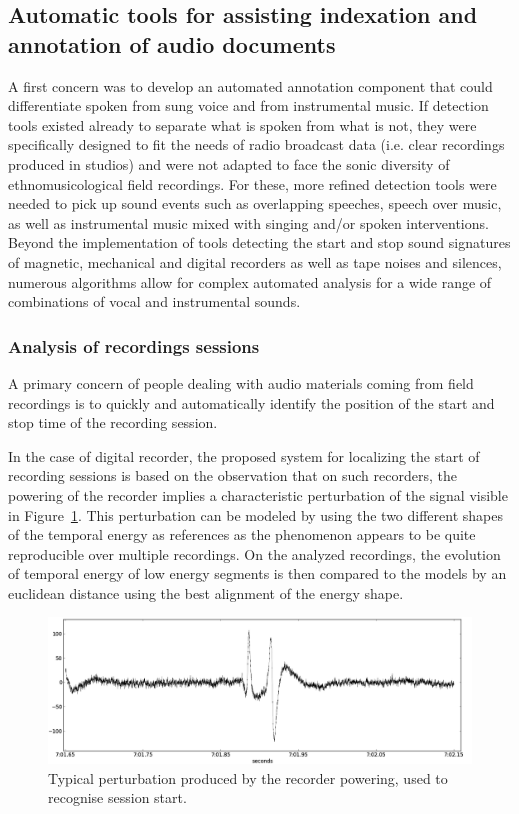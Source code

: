 \documentclass{sig-alternate}
\begin{document}
\subsection{Automatic tools for assisting indexation and annotation of audio documents}
A first concern was to develop an automated annotation component that could differentiate spoken from sung voice and from instrumental music. If detection tools existed already to separate what is spoken from what is not, they were specifically designed to fit the needs of radio broadcast data (i.e. clear recordings produced in studios) and were not adapted to face the sonic diversity of ethnomusicological field recordings. For these, more refined detection tools were needed to pick up sound events such as overlapping speeches, speech over music, as well as instrumental music mixed with singing and/or spoken interventions.
Beyond the implementation of tools detecting the start and stop sound signatures of magnetic, mechanical and digital recorders as well as tape noises and silences, numerous algorithms allow for complex automated analysis for a wide range of combinations of vocal and instrumental sounds.


\subsubsection{Analysis of recordings sessions}
A primary concern of people dealing with audio materials coming from field recordings is to quickly and automatically identify the position of the start and stop time of the recording session.

In the case of digital recorder, the proposed system for localizing the start of recording sessions is based on the observation that on such recorders, the powering of the recorder implies a characteristic perturbation of the signal visible in Figure~\ref{plop}. This perturbation can be modeled by using the two different shapes of the temporal energy as references as the phenomenon appears to be quite reproducible over multiple recordings. On the analyzed recordings, the evolution of temporal energy of low energy segments is then compared to the models by an euclidean distance using the best alignment of the energy shape.

\begin{figure}[htb]
 \centering
    \includegraphics[width=0.8\linewidth]{img/plop.png}
    \caption{Typical perturbation produced by the recorder powering, used to recognise session start.}
    \label{plop}
\end{figure}
\end{document}
